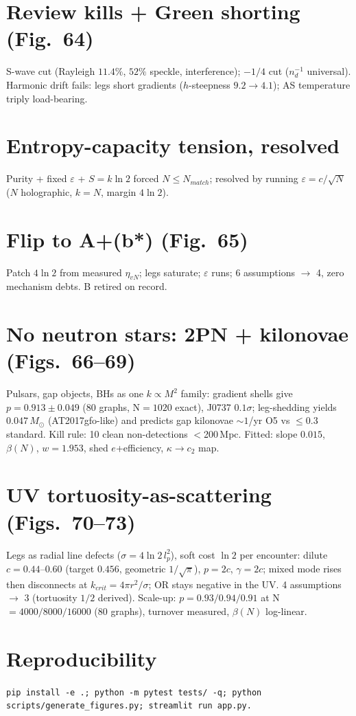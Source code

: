 \documentclass[11pt]{article}
\begin{document}
\section{Review kills + Green shorting (Fig.~64)}
S-wave cut (Rayleigh $11.4\%$, $52\%$ speckle, interference); $-1/4$ cut
($n_d^{-1}$ universal). Harmonic drift fails: legs short gradients
($h$-steepness $9.2\to4.1$); AS temperature triply load-bearing.

\section{Entropy-capacity tension, resolved}
Purity + fixed $\varepsilon$ + $S=k\ln2$ forced $N\le N_{match}$; resolved by
running $\varepsilon=c/\sqrt N$ ($N$ holographic, $k=N$, margin $4\ln2$).

\section{Flip to A+(b*) (Fig.~65)}
Patch $4\ln2$ from measured $\eta_{vN}$; legs saturate; $\varepsilon$ runs;
6 assumptions $\to$ 4, zero mechanism debts. B retired on record.

\section{No neutron stars: 2PN + kilonovae (Figs.~66--69)}
Pulsars, gap objects, BHs as one $k\propto M^2$ family: gradient shells give
$p=0.913\pm0.049$ (80 graphs, N$=1020$ exact), J0737 $0.1\sigma$;
leg-shedding yields $0.047\,M_\odot$ (AT2017gfo-like) and predicts gap
kilonovae $\sim1$/yr O5 vs $\le0.3$ standard. Kill rule: 10 clean
non-detections $<$200\,Mpc. Fitted: slope $0.015$, $\beta(N)$, $w=1.953$,
shed $e$+efficiency, $\kappa\to c_2$ map.

\section{UV tortuosity-as-scattering (Figs.~70--73)}
Legs as radial line defects ($\sigma=4\ln2\,l_p^2$), soft cost $\ln2$ per
encounter: dilute $c=0.44$--$0.60$ (target $0.456$, geometric $1/\sqrt\pi$),
$p=2c$, $\gamma=2c$; mixed mode rises then disconnects at
$k_{crit}=4\pi r^2/\sigma$; OR stays negative in the UV. 4 assumptions
$\to$ 3 (tortuosity $1/2$ derived). Scale-up: $p=0.93/0.94/0.91$ at
N$=4000/8000/16000$ (80 graphs), turnover measured, $\beta(N)$ log-linear.

\section*{Reproducibility}
\texttt{pip install -e .; python -m pytest tests/ -q; python scripts/generate\_figures.py; streamlit run app.py.}
\end{document}

